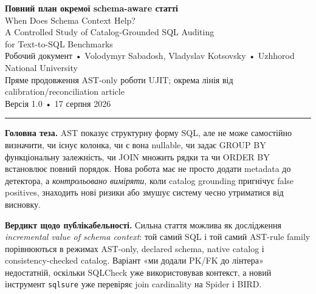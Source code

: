 \documentclass[11pt,a4paper]{article}
\begin{document}
\begin{center}
{\sffamily\LARGE\bfseries\color{accent} Повний план окремої schema-aware статті}\\[5pt]
{\sffamily\large When Does Schema Context Help?\\
A Controlled Study of Catalog-Grounded SQL Auditing\\
for Text-to-SQL Benchmarks}\\[11pt]
{\footnotesize\sffamily
Робочий документ • Volodymyr Sabadosh, Vladyslav Kotsovsky • Uzhhorod National University\\
Пряме продовження AST-only роботи UJIT; окрема лінія від calibration/reconciliation article\\
Версія 1.0 • 17 серпня 2026}
\end{center}

\vspace{7pt}
\noindent\textcolor{rule}{\rule{\textwidth}{0.8pt}}
\vspace{9pt}

\begin{thesisbox}
\textbf{Головна теза.} AST показує структурну форму SQL, але не може самостійно визначити,
чи існує колонка, чи є вона nullable, чи задає GROUP BY функціональну залежність, чи
JOIN множить рядки та чи ORDER BY встановлює повний порядок. Нова робота має не просто
додати metadata до детектора, а \emph{контрольовано виміряти}, коли catalog grounding
пригнічує false positives, знаходить нові ризики або змушує систему чесно утриматися
від висновку.
\end{thesisbox}

\begin{keybox}
\textbf{Вердикт щодо публікабельності.} Сильна стаття можлива як дослідження
\emph{incremental value of schema context}: той самий SQL і той самий AST-rule family
порівнюються в режимах AST-only, declared schema, native catalog і consistency-checked
catalog. Варіант «ми додали PK/FK до лінтера» недостатній, оскільки SQLCheck уже
використовував контекст, а новий інструмент \texttt{sqlsure} уже перевіряє join cardinality
на Spider і BIRD.
\end{keybox}
\end{document}
